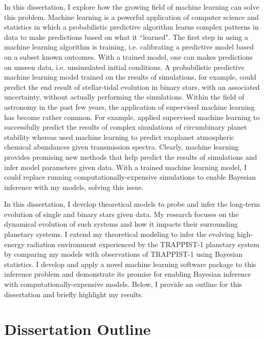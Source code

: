 In this dissertation, I explore how the growing field of machine learning can solve this problem. Machine learning is a powerful application of computer science and statistics in which a probabilistic predictive algorithm learns complex patterns in data to make predictions based on what it ``learned". The first step in using a machine learning algorithm is training, i.e. calibrating a predictive model based on a subset known outcomes.  With a trained model, one can makes predictions on unseen data, i.e. unsimulated initial conditions.  A probabilistic predictive machine learning model trained on the results of \vplanet simulations, for example, could predict the end result of stellar-tidal evolution in binary stars, with an associated uncertainty, without actually performing the simulations.  Within the field of astronomy in the past few years, the application of supervised machine learning has become rather common. For example, \citet{Lam2018} applied supervised machine learning to successfully predict the results of complex simulations of circumbinary planet stability whereas \citet{Waldmann2016} used machine learning to predict exoplanet atmospheric chemical abundances given transmission spectra. Clearly, machine learning provides promising new methods that help predict the results of simulations and infer model parameters given data. With a trained machine learning model, I could replace running computationally-expensive simulations to enable Bayesian inference with my models, solving this issue. 

In this dissertation, I develop theoretical models to probe and infer the long-term evolution of single and binary stars given data. My research focuses on the dynamical evolution of such systems and how it impacts their surrounding planetary systems. I extend my theoretical modeling to infer the evolving high-energy radiation environment experienced by the TRAPPIST-1 planetary system by comparing my models with observations of TRAPPIST-1 using Bayesian statistics. I develop and apply a novel machine learning software package to this inference problem and demonstrate its promise for enabling Bayesian inference with computationally-expensive models. Below, I provide an outline for this dissertation and briefly highlight my results. 

\section{Dissertation Outline}

